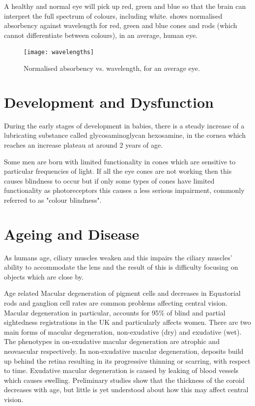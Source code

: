 A healthy and normal eye will pick up red, green and blue so that the brain
can interpret the full spectrum of colours, including white. 
shows normalised absorbency against wavelength for red, green and blue cones
and rods (which cannot differentiate between colours), in an average, human eye.

\begin{figure}[htbp]
  \centering
    \texttt{[image: wavelengths]}
  \caption{Normalised absorbency vs. wavelength, for an average eye.}
  \label{fig:wavelengths}
\end{figure}

\section{Development and Dysfunction}

During the early stages of development in babies, there is a steady
increase of a lubricating substance called glycosaminoglycan hexosamine,
in the cornea which reaches an increase plateau at around 2 years of age.
\cite{praus1975glycosaminoglycans}


Some men are born with limited functionality in cones which are
sensitive to particular frequencies of light.\cite{george1996clinical}
If all the eye cones are not working then this causes blindness
to occur but if only some types of cones have limited functionality
as photoreceptors this causes a less serious impairment, commonly
referred to as "colour blindness".

\section{Ageing and Disease}

As humans age, ciliary muscles weaken and this impairs the ciliary
muscles' ability to accommodate the lens and the result of this is
difficulty focusing on objects which are close by.\cite{fisher1985ciliary}


Age related Macular degeneration of pigment cells and decreases in
Equatorial rods and ganglion cell rates are common problems affecting
central vision.\cite{gao1992aging} Macular degeneration in particular,
accounts for 95\% of blind and partial sightedness registrations in the
UK and particularly affects women.\cite{o1998age,klein2005complement}
There are two main forms of macular degeneration, non-exudative (dry)
and exudative (wet). The phenotypes in on-exudative macular degeneration
are atrophic and neovascular respectively.\cite{kuno2011dry} In
non-exudative macular degeneration, deposits build up behind the retina
resulting in its progressive thinning or scarring, with respect to time.
Exudative macular degeneration is caused by leaking of blood vessels which
causes swelling. Preliminary studies show that the thickness
of the coroid decreases with age, but little is yet understood about how this
may affect central vision.\cite{margolis2009pilot}
